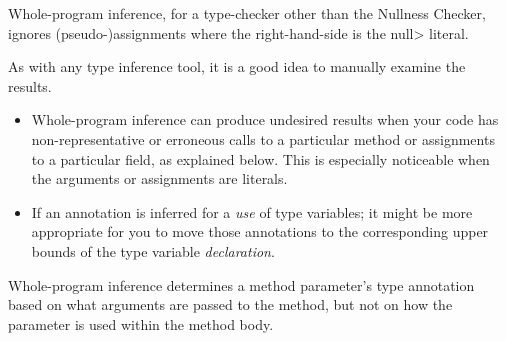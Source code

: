 Whole-program inference, for a type-checker other than the Nullness Checker,
ignores (pseudo-)assignments where the right-hand-side is the \<null> literal.



As with any type inference tool, it is a good idea to manually examine the
results.

\begin{itemize}
\item
Whole-program inference can produce undesired results when your code has
non-representative or erroneous calls to a particular method or assignments to a
particular field, as explained below.
This is especially noticeable when the arguments or assignments are literals.

\item
If an annotation is inferred for a \emph{use} of type variables;
it might be more appropriate for you to move those annotations
to the corresponding upper bounds of the type variable \emph{declaration}.

\end{itemize}



Whole-program inference determines a method parameter's type
annotation based on what arguments are passed to the method, but not on how the
parameter is used within the method body.


